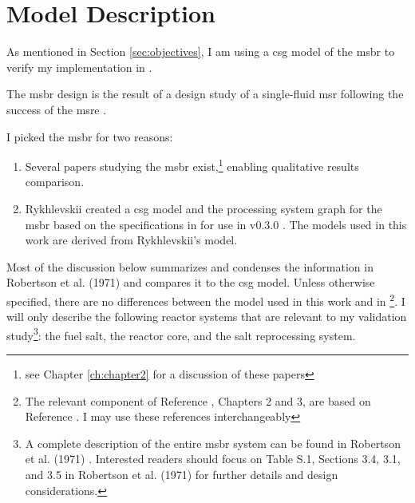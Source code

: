 \chapter{Model Description}
\label{ch:chapter4}
As mentioned in Section \ref{sec:objectives}, I am using a \Gls{csg} model of
the \Gls{msbr} \cite{robertson_conceptual_1971} to verify my \OpenMC
implementation in \SaltProc.

The \Gls{msbr} design is the result of a design study of a single-fluid
\Gls{msr} following the success of the \Gls{msre}
\cite{haubenreich_experience_1970} \cite{rosenthal_history_1970}.

I picked the \Gls{msbr} for two reasons:
\begin{enumerate}
    \item Several papers studying the \Gls{msbr} exist,\footnote{see Chapter
    \ref{ch:chapter2} for a discussion of these papers} enabling qualitative
    results comparison.
    \item Rykhlevskii created a \SerpentTWO \Gls{csg} model and the processing
    system graph for the \Gls{msbr} based on the specifications in
    \cite{robertson_conceptual_1971} for use in \SaltProc
    v0.3.0 \cite{rykhlevskii_fuel_2020}. The models used in this work are derived
    from Rykhlevskii's model.
\end{enumerate}

Most of the discussion below summarizes and condenses the information in
Robertson et al. (1971) and compares it to the \Gls{csg} model. Unless otherwise
specified, there are no differences between the model used in this work and in
\cite{rykhlevskii_fuel_2020}\footnote{The relevant component of Reference
\cite{rykhlevskii_fuel_2020}, Chapters 2 and 3, are based on Reference
\cite{rykhlevskii_modeling_2019}. I may use these references interchangeably}. I
will only describe the following reactor systems that are relevant to my
validation study\footnote{A complete description of the entire \Gls{msbr} system
can be found in Robertson et al. (1971) \cite{robertson_conceptual_1971}.
Interested readers should focus on Table S.1, Sections 3.4, 3.1, and 3.5 in
Robertson et al. (1971) for further details and design considerations.}: the
fuel salt, the reactor core, and the salt reprocessing system.


